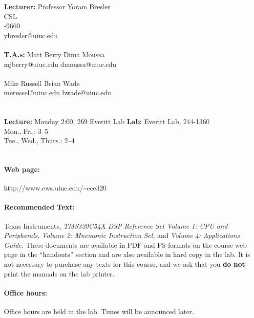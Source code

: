 \documentclass[11pt]{handout}
\begin{document}
\setlength{\baselineskip}{0.5cm}
\setlength{\parskip}{0.5cm}

\makeboxtitle
\vspace{0.3cm}

\begin{tabbing}
{\bf Lecturer:} \= Professor Yoram Bresler \hspace{1.2in} \= 
{\bf \hspace{1.0in}} \= \\
 CSL   \> \> \\
-9660 \> \> \\
\> ybresler@uiuc.edu \> \> \\
 \\
{\bf T.A.s:} 
\> Matt Berry \> \> Dima Moussa \\
\> mjberry@uiuc.edu \> \> dmoussa@uiuc.edu \\
 \\
\> Mike Russell \> \> Brian Wade \\ 
\> merussel@uiuc.edu \> \> bwade@uiuc.edu \\
 \\ 
 \\
{\bf Lecture:} 
\> Monday 2:00, 269 Everitt Lab \> {\bf Lab:}  Everitt Lab,  \hspace{.2in} 244-1360 \\
\> \> \> Mon., Fri.: 3--5 \\
\> \> \> Tue., Wed., Thurs.: 2--4 \\
 \\
\end{tabbing}

\paragraph{Web page:} http://www.ews.uiuc.edu/\~{}ece320 

\paragraph{Recommended Text:}
Texas Instruments,
{\em TMS320C54X DSP Reference Set Volume 1: CPU and Peripherals, 
Volume 2: Mnemonic Instruction Set}, and {\em Volume 4: Applications Guide}.
These documents are available in PDF and PS formats on the course web page 
in the ``handouts'' section and are also available in hard copy in the lab.  
It is not necessary to purchase any texts for this course, and we ask that 
you {\bf do not} print the manuals on the lab printer.

\paragraph{Office hours:} Office hours are held in the lab.  Times will 
be announced later.  
\end{document}
